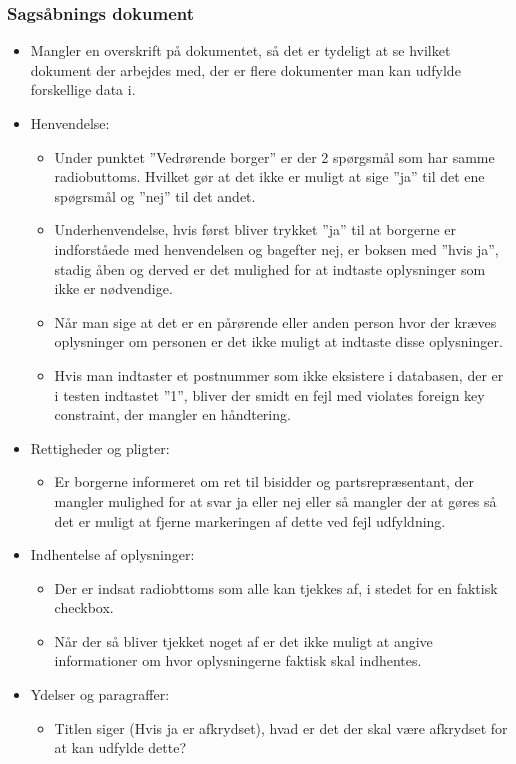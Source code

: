 \subsubsection{Sagsåbnings dokument}
\begin{itemize}
\item Mangler en overskrift på dokumentet, så det er tydeligt at se hvilket dokument der arbejdes med, der er flere dokumenter man kan udfylde forskellige data i.
\item Henvendelse:
\begin{itemize}
\item Under punktet ”Vedrørende borger” er der 2 spørgsmål som har samme radiobuttoms. Hvilket gør at det ikke er muligt at sige ”ja” til det ene spøgrsmål og ”nej” til det andet.
\item Underhenvendelse, hvis først bliver trykket ”ja” til at borgerne er indforståede med henvendelsen og bagefter nej, er boksen med ”hvis ja”, stadig åben og derved er det mulighed for at indtaste oplysninger som ikke er nødvendige.
\item Når man sige at det er en pårørende eller anden person hvor der kræves oplysninger om personen er det ikke muligt at indtaste disse oplysninger.
\item Hvis man indtaster et postnummer som ikke eksistere i databasen, der er i testen indtastet ”1”, bliver der smidt en fejl med violates foreign key constraint, der mangler en håndtering.
\end{itemize}
\item Rettigheder og pligter:
\begin{itemize}
\item Er borgerne informeret om ret til bisidder og partsrepræsentant, der mangler mulighed for at svar ja eller nej eller så mangler der at gøres så det er muligt at fjerne markeringen af dette ved fejl udfyldning.
\end{itemize}
\item Indhentelse af oplysninger:
\begin{itemize}
\item Der er indsat radiobttoms som alle kan tjekkes af, i stedet for en faktisk checkbox.
\item Når der så bliver tjekket noget af er det ikke muligt at angive informationer om hvor oplysningerne faktisk skal indhentes.
\end{itemize}
\item Ydelser og paragraffer:
\begin{itemize}
\item Titlen siger (Hvis ja er afkrydset), hvad er det der skal være afkrydset for at kan udfylde dette?

\end{itemize}
\end{itemize}
